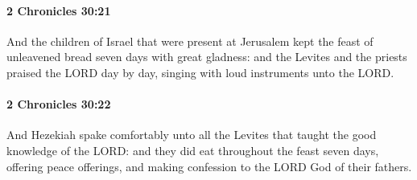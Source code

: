 		\paragraph{2 Chronicles 30:21} %
			\label{2CHRONICLES-30-21}

			And the children of Israel that were present at Jerusalem kept the feast of unleavened bread seven days with great gladness: and the Levites and the priests praised the LORD day by day, singing with loud instruments unto the LORD.


		\paragraph{2 Chronicles 30:22} %
			\label{2CHRONICLES-30-22}

			And Hezekiah spake comfortably unto all the Levites that taught the good knowledge of the LORD: and they did eat throughout the feast seven days, offering peace offerings, and making confession to the LORD God of their fathers.

